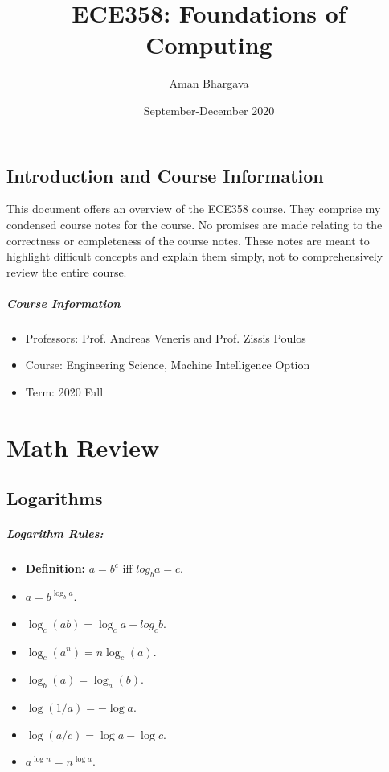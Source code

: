 \documentclass[a4paper,12pt]{report}
\begin{document}
\title{ECE358: Foundations of Computing}
\author{Aman Bhargava}
\date{September-December 2020}
\maketitle

\tableofcontents

\section{Introduction and Course Information}

This document offers an overview of the ECE358 course. They comprise my condensed course notes for the course. No promises are made relating to the correctness or completeness of the course notes. These notes are meant to highlight difficult concepts and explain them simply, not to comprehensively review the entire course.

\paragraph{Course Information}
\begin{itemize}
\item Professors: Prof. Andreas Veneris and Prof. Zissis Poulos
\item Course: Engineering Science, Machine Intelligence Option
\item Term: 2020 Fall
\end{itemize}

\chapter{Math Review}

\section{Logarithms}

\paragraph{Logarithm Rules: } 
\begin{itemize}
\item \textbf{Definition: } $a = b^c$ iff $log_b a = c$.
\item $a = b^{\log_b a}$.
\item $\log_c(ab) = \log_c a + log_c b$.
\item $\log_c(a^n) = n\log_c(a)$.
\item $\log_b(a) = \log_a(b)$.
\item $\log(1/a) = -\log a$.
\item $\log(a/c) = \log a - \log c$.
\item $a^{\log n} = n^{\log a}$.
\end{itemize}
\end{document}
